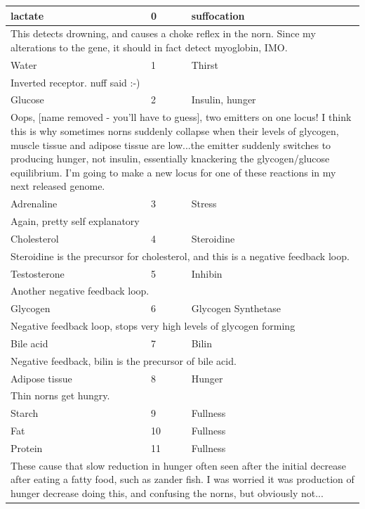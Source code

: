 \documentclass[11pt,twoside,a4paper]{article}
\begin{document}
\begin{longtable}{|p{}|p{}|p{}|}
lactate		&	0	&	suffocation \\ \hline
\multicolumn{3}{|p{0.90\textwidth}|}{This detects drowning, and causes a choke reflex in the norn. Since my alterations to the gene, it should in fact detect myoglobin, IMO. } \\ \hline
Water		&	1	&	Thirst \\ \hline
\multicolumn{3}{|p{0.90\textwidth}|}{Inverted receptor. nuff said :-) } \\ \hline
Glucose		&	2	&	Insulin, hunger \\ \hline
\multicolumn{3}{|p{0.90\textwidth}|}{Oops, [name removed - you'll have to guess], two emitters on one locus! I think this is why sometimes norns suddenly collapse when their levels of glycogen, muscle tissue and adipose tissue are low...the emitter suddenly switches to producing hunger, not insulin, essentially knackering the glycogen/glucose equilibrium. I'm going to make a new locus for one of these reactions in my next released genome. } \\ \hline
Adrenaline	&	3	&	Stress \\ \hline
\multicolumn{3}{|p{0.90\textwidth}|}{Again, pretty self explanatory } \\ \hline
Cholesterol	&	4	&	Steroidine \\ \hline
\multicolumn{3}{|p{0.90\textwidth}|}{Steroidine is the precursor for cholesterol, and this is a negative feedback loop. } \\ \hline
Testosterone	&	5	&	Inhibin \\ \hline
\multicolumn{3}{|p{0.90\textwidth}|}{Another negative feedback loop. } \\ \hline
Glycogen	&	6	&	Glycogen Synthetase \\ \hline
\multicolumn{3}{|p{0.90\textwidth}|}{Negative feedback loop, stops very high levels of glycogen forming } \\ \hline
Bile acid	&	7	&	Bilin \\ \hline
\multicolumn{3}{|p{0.90\textwidth}|}{Negative feedback, bilin is the precursor of bile acid. } \\ \hline
Adipose tissue	&	8	&	Hunger \\ \hline
\multicolumn{3}{|p{0.90\textwidth}|}{Thin norns get hungry. } \\ \hline
Starch		&	9	&	Fullness \\ \hline
Fat		&	10	&	Fullness \\ \hline
Protein		&	11	&	Fullness \\ \hline
\multicolumn{3}{|p{0.90\textwidth}|}{These cause that slow reduction in hunger often seen after the initial decrease after eating a fatty food, such as zander fish. I was worried it was production of hunger decrease doing this, and confusing the norns, but obviously not... } \\ \hline

\end{longtable}
\end{document}

